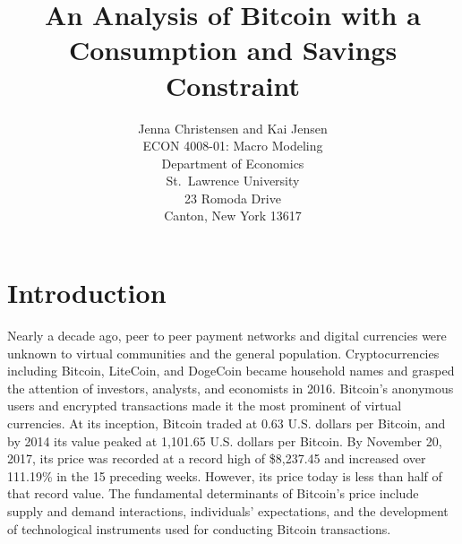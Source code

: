 \documentclass[]{article}
\title{An Analysis of Bitcoin with a Consumption and Savings Constraint}
\author{Jenna Christensen and Kai Jensen\\
ECON 4008-01: Macro Modeling\\
Department of Economics\\
St.~Lawrence University\\
23 Romoda Drive\\
Canton, New York 13617}
\date{}
\begin{document}
\maketitle

\section{Introduction}\label{introduction}

Nearly a decade ago, peer to peer payment networks and digital
currencies were unknown to virtual communities and the general
population. Cryptocurrencies including Bitcoin, LiteCoin, and DogeCoin
became household names and grasped the attention of investors, analysts,
and economists in 2016. Bitcoin's anonymous users and encrypted
transactions made it the most prominent of virtual currencies. At its
inception, Bitcoin traded at 0.63 U.S. dollars per Bitcoin, and by 2014
its value peaked at 1,101.65 U.S. dollars per Bitcoin. By November 20,
2017, its price was recorded at a record high of \$8,237.45 and
increased over 111.19\% in the 15 preceding weeks. However, its price
today is less than half of that record value. The fundamental
determinants of Bitcoin's price include supply and demand interactions,
individuals' expectations, and the development of technological
instruments used for conducting Bitcoin transactions.
\end{document}
